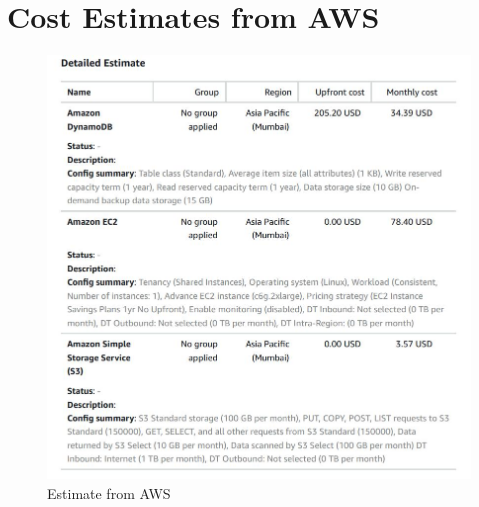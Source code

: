 \documentclass[11pt]{article}
\begin{document}
\section{Cost Estimates from AWS}

\begin{figure}[H]
    \centering
    \includegraphics[width=.95\textwidth]{aws estimate.jpg}
    \caption{Estimate from AWS}
\end{figure}
\end{document}
